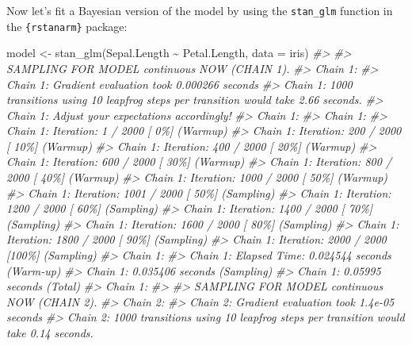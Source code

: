 \documentclass[10pt,a4paper,onecolumn]{article}
\newenvironment{Shaded}{\begin{snugshade}}{\end{snugshade}}
\newcommand{\AttributeTok}[1]{\textcolor[rgb]{0.77,0.63,0.00}{#1}}
\newcommand{\CommentTok}[1]{\textcolor[rgb]{0.56,0.35,0.01}{\textit{#1}}}
\newcommand{\FunctionTok}[1]{\textcolor[rgb]{0.00,0.00,0.00}{#1}}
\newcommand{\NormalTok}[1]{#1}
\newcommand{\OtherTok}[1]{\textcolor[rgb]{0.56,0.35,0.01}{#1}}
\newcommand{\SpecialCharTok}[1]{\textcolor[rgb]{0.00,0.00,0.00}{#1}}
\begin{document}
Now let's fit a Bayesian version of the model by using the
\texttt{stan\_glm} function in the \texttt{\{rstanarm\}} package:

\begin{Shaded}
\begin{Highlighting}[]
\NormalTok{model }\OtherTok{\textless{}{-}} \FunctionTok{stan\_glm}\NormalTok{(Sepal.Length }\SpecialCharTok{\textasciitilde{}}\NormalTok{ Petal.Length, }\AttributeTok{data =}\NormalTok{ iris)}
\CommentTok{\#\textgreater{} }
\CommentTok{\#\textgreater{} SAMPLING FOR MODEL \textquotesingle{}continuous\textquotesingle{} NOW (CHAIN 1).}
\CommentTok{\#\textgreater{} Chain 1: }
\CommentTok{\#\textgreater{} Chain 1: Gradient evaluation took 0.000266 seconds}
\CommentTok{\#\textgreater{} Chain 1: 1000 transitions using 10 leapfrog steps per transition would take 2.66 seconds.}
\CommentTok{\#\textgreater{} Chain 1: Adjust your expectations accordingly!}
\CommentTok{\#\textgreater{} Chain 1: }
\CommentTok{\#\textgreater{} Chain 1: }
\CommentTok{\#\textgreater{} Chain 1: Iteration:    1 / 2000 [  0\%]  (Warmup)}
\CommentTok{\#\textgreater{} Chain 1: Iteration:  200 / 2000 [ 10\%]  (Warmup)}
\CommentTok{\#\textgreater{} Chain 1: Iteration:  400 / 2000 [ 20\%]  (Warmup)}
\CommentTok{\#\textgreater{} Chain 1: Iteration:  600 / 2000 [ 30\%]  (Warmup)}
\CommentTok{\#\textgreater{} Chain 1: Iteration:  800 / 2000 [ 40\%]  (Warmup)}
\CommentTok{\#\textgreater{} Chain 1: Iteration: 1000 / 2000 [ 50\%]  (Warmup)}
\CommentTok{\#\textgreater{} Chain 1: Iteration: 1001 / 2000 [ 50\%]  (Sampling)}
\CommentTok{\#\textgreater{} Chain 1: Iteration: 1200 / 2000 [ 60\%]  (Sampling)}
\CommentTok{\#\textgreater{} Chain 1: Iteration: 1400 / 2000 [ 70\%]  (Sampling)}
\CommentTok{\#\textgreater{} Chain 1: Iteration: 1600 / 2000 [ 80\%]  (Sampling)}
\CommentTok{\#\textgreater{} Chain 1: Iteration: 1800 / 2000 [ 90\%]  (Sampling)}
\CommentTok{\#\textgreater{} Chain 1: Iteration: 2000 / 2000 [100\%]  (Sampling)}
\CommentTok{\#\textgreater{} Chain 1: }
\CommentTok{\#\textgreater{} Chain 1:  Elapsed Time: 0.024544 seconds (Warm{-}up)}
\CommentTok{\#\textgreater{} Chain 1:                0.035406 seconds (Sampling)}
\CommentTok{\#\textgreater{} Chain 1:                0.05995 seconds (Total)}
\CommentTok{\#\textgreater{} Chain 1: }
\CommentTok{\#\textgreater{} }
\CommentTok{\#\textgreater{} SAMPLING FOR MODEL \textquotesingle{}continuous\textquotesingle{} NOW (CHAIN 2).}
\CommentTok{\#\textgreater{} Chain 2: }
\CommentTok{\#\textgreater{} Chain 2: Gradient evaluation took 1.4e{-}05 seconds}
\CommentTok{\#\textgreater{} Chain 2: 1000 transitions using 10 leapfrog steps per transition would take 0.14 seconds.}

\end{Highlighting}
\end{Shaded}
\end{document}
